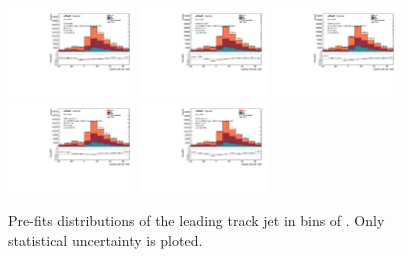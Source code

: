 \clearpage
\subsection{\dphi}

\begin{figure}[htbp]
  \centering
 \includegraphics[width=0.3\textwidth]{figures/gbb/Sub_Sd0_Fits/Canv_PreFit_0-Deltatheta-0628_LpT_INF_SpT_INF_coarse_x.pdf}
 \includegraphics[width=0.3\textwidth]{figures/gbb/Sub_Sd0_Fits/Canv_PreFit_0628-Deltatheta-1256_LpT_INF_SpT_INF_coarse_x.pdf}
 \includegraphics[width=0.3\textwidth]{figures/gbb/Sub_Sd0_Fits/Canv_PreFit_1256-Deltatheta-1884_LpT_INF_SpT_INF_coarse_x.pdf}\\
 \includegraphics[width=0.3\textwidth]{figures/gbb/Sub_Sd0_Fits/Canv_PreFit_1884-Deltatheta-2512_LpT_INF_SpT_INF_coarse_x.pdf}
 \includegraphics[width=0.3\textwidth]{figures/gbb/Sub_Sd0_Fits/Canv_PreFit_2512-Deltatheta-3140_LpT_INF_SpT_INF_coarse_x.pdf}
\caption{Pre-fits \subsdzero distributions of the leading track jet in bins of \dphi. Only statistical uncertainty is ploted.}
  \label{fig:dphi-prefits-leading-sub}
\end{figure}


